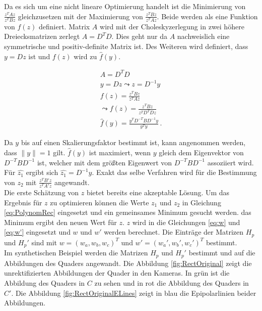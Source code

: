 Da es sich um eine nicht lineare Optimierung handelt ist die Minimierung von  $\frac{z^TAz}{z^TBz}$ gleichzusetzen mit der Maximierung von  $\frac{z^TBz}{z^TAz}$. Beide werden als eine Funktion von $f(z)$ definiert. Matrix $A$ wird mit der Choleskyzerlegung\cite{FormelsammlungMatrizen} in zwei höhere Dreiecksmatrizen zerlegt $A = D^TD$. Dies geht nur da $A$ nachweislich eine symmetrische und positiv-definite Matrix ist\cite{Fortran77,FormelsammlungMatrizen}. Des Weiteren wird definiert, dass $y = Dz$ ist und $f(z)$ wird zu $\hat{f}(y)$\cite{ZZ}.

\begin{gather}
	A = D^TD\\
	y= Dz \leadsto z= D^{-1}y\\
	f(z)= \frac{z^TBz}{z^TAz}\\
	\leadsto 
	f(z)=\frac{z^TBz}{z^TD^TDz}\\
	\hat{f}(y)= \frac{y^TD^{-T}BD^{-1}y}{y^Ty} \, .
\end{gather} 

Da $y$ bis auf einen Skalierungsfaktor bestimmt ist, kann angenommen werden, dass $\parallel y \parallel = 1$ gilt. $\hat{f}(y)$ ist maximiert, wenn $y$ gleich dem Eigenvektor von $D^{-T}BD^{-1}$ ist, welcher mit dem größten Eigenwert von $D^{-T}BD^{-1}$ assoziiert wird\cite{ZZ}. Für $\hat{z_1}$ ergibt sich $\hat{z_1} = D^{-1}y$. Exakt das selbe Verfahren wird für die Bestimmung von $z_2$ mit  $\frac{z^TB'z}{z^TA'z}$ angewandt\cite{ZZ}.\\


Die erste Schätzung von $z$ bietet bereits eine akzeptable Lösung. Um das Ergebnis für $z$ zu optimieren können die Werte $z_1$ und $z_2$ in Gleichung \ref{eq:PolynomRec} eingesetzt und ein gemeinsames Minimum gesucht werden. das Minimum ergibt den neuen Wert für $z$. $z$ wird in die Gleichungen \ref{eq:w} und \ref{eq:w'} eingesetzt und $w$ und $w'$ werden berechnet. Die Einträge der Matrizen $H_p$ und $H_p'$ sind mit $w = (w_a,w_b,w_c)^T$ und $w' = (w_a',w_b',w_c')^T$ bestimmt\cite{ZZ}.\\

Im synthetischen Beispiel werden die Matrizen $H_p$ und $H_p'$ bestimmt und auf die Abbildungen des Quaders angewandt. Die Abbildung \ref{fig:RectOriginal} zeigt die unrektifizierten Abbildungen der Quader in den Kameras. In grün ist die Abbildung des Quaders in $C$ zu sehen und in rot die Abbildung des Quaders in $C'$. Die Abbildung \ref{fig:RectOriginalELines} zeigt in blau die Epipolarlinien beider Abbildungen. 


